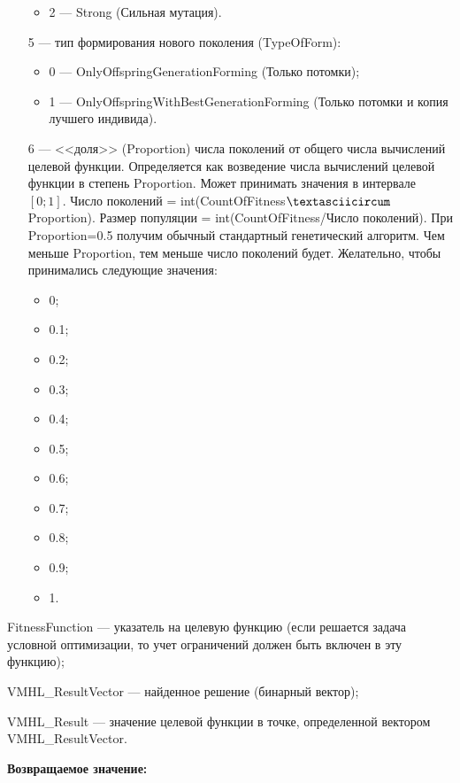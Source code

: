 \documentclass[a4paper,12pt]{article}
\begin{document}
\begin{itemize}
\begin{itemize}
       \item 2 --- Strong (Сильная мутация).
	    \end{itemize}
 
 \item [5] --- тип формирования нового поколения (TypeOfForm):
  \begin{itemize}
       \item 0 --- OnlyOffspringGenerationForming (Только потомки);
 
       \item 1 --- OnlyOffspringWithBestGenerationForming (Только потомки и копия лучшего индивида).
	    \end{itemize}
		
 \item [6] --- <<доля>> (Proportion) числа поколений от общего числа вычислений целевой функции. Определяется как возведение числа вычислений целевой функции в степень Proportion. Может принимать значения в интервале $[0;1]$. Число поколений = int(CountOfFitness$\textasciicircum$Proportion). Размер популяции = int(CountOfFitness/Число поколений). При Proportion=0.5 получим обычный стандартный генетический алгоритм. Чем меньше Proportion, тем меньше число поколений будет. Желательно, чтобы принимались следующие значения:
  \begin{itemize}
       \item 0;
	   \item 0.1;
	   \item 0.2;
	   \item 0.3;
	   \item 0.4;
	   \item 0.5;
	   \item 0.6;
	   \item 0.7;
	   \item 0.8;
	   \item 0.9; 
       \item 1.
	    \end{itemize}
 \end{itemize}
 
FitnessFunction --- указатель на целевую функцию (если решается задача условной оптимизации, то учет ограничений должен быть включен в эту функцию);
 
VMHL\_ResultVector --- найденное решение (бинарный вектор);
 
VMHL\_Result --- значение целевой функции в точке, определенной вектором VMHL\_ResultVector.

\textbf{Возвращаемое значение:} 
\end{document}
